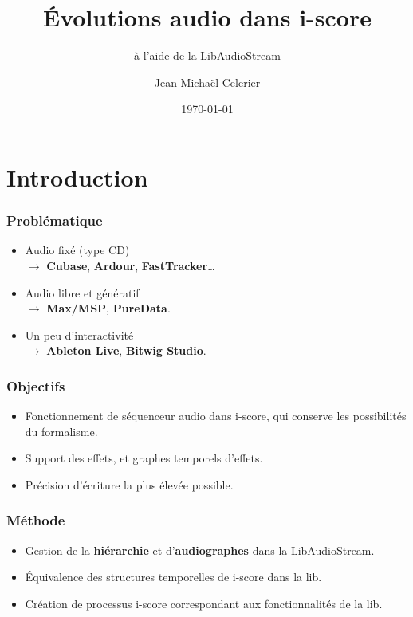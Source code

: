 \documentclass{beamer}
\title{Évolutions audio dans i-score}
\subtitle{à l'aide de la LibAudioStream}
\date{\today}
\author{Jean-Michaël Celerier}
\institute{LaBRI, Blue Yeti}
\begin{document}
    
\maketitle
\begin{frame}
	\tableofcontents
\end{frame}
\section{Introduction}
\begin{frame}
    \frametitle{Problématique}    
    \Large
    \begin{itemize}
    	\item<1-> Audio fixé (type CD) \\ $\rightarrow$ \textbf{Cubase}, \textbf{Ardour}, \textbf{FastTracker}\dots
    	\item<2-> Audio libre et génératif \\  $\rightarrow$ \textbf{Max/MSP}, \textbf{PureData}.
    	\item<3-> Un peu d'interactivité \\ $\rightarrow$ \textbf{Ableton Live}, \textbf{Bitwig Studio}.~\\
    \end{itemize}    
\end{frame}

\begin{frame}
	\frametitle{Objectifs}    
	\Large
	\begin{itemize}
		\item<1-> Fonctionnement de séquenceur audio dans i-score, qui conserve les possibilités du formalisme.
		\item<2-> Support des effets, et graphes temporels d'effets.
		\item<3-> Précision d'écriture la plus élevée possible.
	\end{itemize}    
\end{frame}

\begin{frame}
	\frametitle{Méthode}    
	\Large
	\begin{itemize}
		\item<1-> Gestion de la \textbf{hiérarchie} et d'\textbf{audiographes} dans la LibAudioStream\cite{letzlibaudiostream}.
		\item<2-> Équivalence des structures temporelles de i-score dans la lib.
		\item<3-> Création de processus i-score correspondant aux fonctionnalités de la lib.
	\end{itemize}    
\end{frame}
\end{document}
